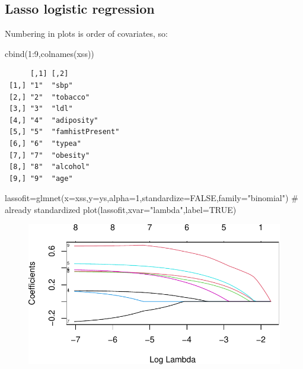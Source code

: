 \documentclass[
  letterpaper,
  DIV=11,
  numbers=noendperiod]{scrartcl}
\newenvironment{Shaded}{\begin{snugshade}}{\end{snugshade}}
\newcommand{\AttributeTok}[1]{\textcolor[rgb]{0.40,0.45,0.13}{#1}}
\newcommand{\CommentTok}[1]{\textcolor[rgb]{0.37,0.37,0.37}{#1}}
\newcommand{\ConstantTok}[1]{\textcolor[rgb]{0.56,0.35,0.01}{#1}}
\newcommand{\DecValTok}[1]{\textcolor[rgb]{0.68,0.00,0.00}{#1}}
\newcommand{\FunctionTok}[1]{\textcolor[rgb]{0.28,0.35,0.67}{#1}}
\newcommand{\NormalTok}[1]{\textcolor[rgb]{0.00,0.23,0.31}{#1}}
\newcommand{\OtherTok}[1]{\textcolor[rgb]{0.00,0.23,0.31}{#1}}
\newcommand{\SpecialCharTok}[1]{\textcolor[rgb]{0.37,0.37,0.37}{#1}}
\newcommand{\StringTok}[1]{\textcolor[rgb]{0.13,0.47,0.30}{#1}}
\begin{document}
\hypertarget{lasso-logistic-regression}{%
\subsection{Lasso logistic regression}\label{lasso-logistic-regression}}

Numbering in plots is order of covariates, so:

\begin{Shaded}
\begin{Highlighting}[]
\FunctionTok{cbind}\NormalTok{(}\DecValTok{1}\SpecialCharTok{:}\DecValTok{9}\NormalTok{,}\FunctionTok{colnames}\NormalTok{(xss))}
\end{Highlighting}
\end{Shaded}

\begin{verbatim}
      [,1] [,2]            
 [1,] "1"  "sbp"           
 [2,] "2"  "tobacco"       
 [3,] "3"  "ldl"           
 [4,] "4"  "adiposity"     
 [5,] "5"  "famhistPresent"
 [6,] "6"  "typea"         
 [7,] "7"  "obesity"       
 [8,] "8"  "alcohol"       
 [9,] "9"  "age"           
\end{verbatim}

\begin{Shaded}
\begin{Highlighting}[]
\NormalTok{lassofit}\OtherTok{=}\FunctionTok{glmnet}\NormalTok{(}\AttributeTok{x=}\NormalTok{xss,}\AttributeTok{y=}\NormalTok{ys,}\AttributeTok{alpha=}\DecValTok{1}\NormalTok{,}\AttributeTok{standardize=}\ConstantTok{FALSE}\NormalTok{,}\AttributeTok{family=}\StringTok{"binomial"}\NormalTok{) }\CommentTok{\# already standardized}
\FunctionTok{plot}\NormalTok{(lassofit,}\AttributeTok{xvar=}\StringTok{"lambda"}\NormalTok{,}\AttributeTok{label=}\ConstantTok{TRUE}\NormalTok{)}
\end{Highlighting}
\end{Shaded}

\begin{figure}[H]

{\centering \includegraphics{L10_files/figure-pdf/unnamed-chunk-9-1.pdf}

}

\end{figure}
\end{document}
